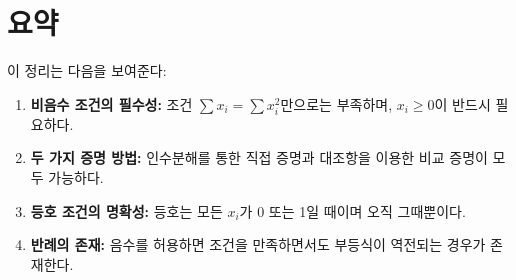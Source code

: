 \documentclass[12pt,a4paper]{article}
\theoremstyle{definition}
\begin{document}
\section*{요약}

이 정리는 다음을 보여준다:

\begin{enumerate}
    \item \textbf{비음수 조건의 필수성:}
    조건 $\sum x_i = \sum x_i^2$만으로는 부족하며, $x_i \geq 0$이 반드시 필요하다.

    \item \textbf{두 가지 증명 방법:}
    인수분해를 통한 직접 증명과 대조항을 이용한 비교 증명이 모두 가능하다.

    \item \textbf{등호 조건의 명확성:}
    등호는 모든 $x_i$가 0 또는 1일 때이며 오직 그때뿐이다.

    \item \textbf{반례의 존재:}
    음수를 허용하면 조건을 만족하면서도 부등식이 역전되는 경우가 존재한다.
\end{enumerate}
\end{document}
